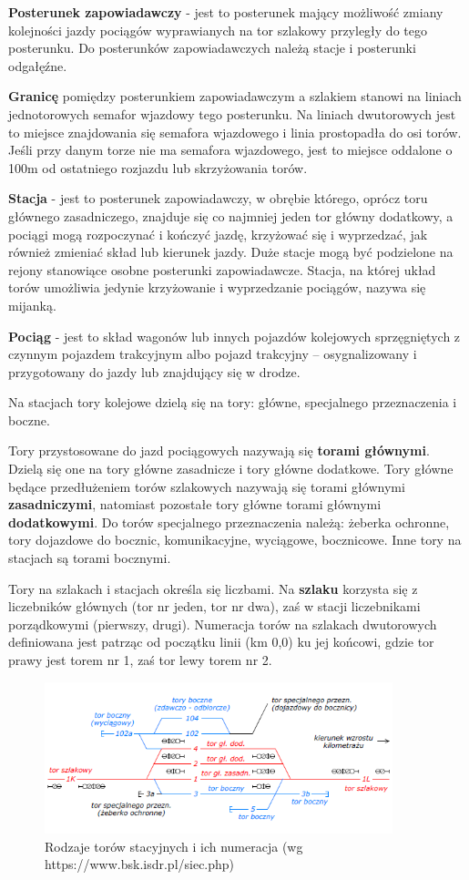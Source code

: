 \textbf{Posterunek zapowiadawczy} - jest to posterunek mający możliwość zmiany kolejności jazdy pociągów wyprawianych na tor szlakowy przyległy do tego posterunku. Do posterunków zapowiadawczych należą stacje i posterunki odgałęźne.

\textbf{Granicę} pomiędzy posterunkiem zapowiadawczym a szlakiem stanowi na liniach jednotorowych semafor wjazdowy tego posterunku. Na liniach dwutorowych jest to miejsce znajdowania się semafora wjazdowego i linia prostopadła do osi torów. Jeśli przy danym torze nie ma semafora wjazdowego, jest to miejsce oddalone o 100m od ostatniego rozjazdu lub skrzyżowania torów.

\textbf{Stacja} - jest to posterunek zapowiadawczy, w obrębie którego, oprócz toru głównego zasadniczego, znajduje się co najmniej jeden tor główny dodatkowy, a pociągi mogą rozpoczynać i kończyć jazdę, krzyżować się i wyprzedzać, jak również zmieniać skład lub kierunek jazdy. Duże stacje mogą być podzielone na rejony stanowiące osobne posterunki zapowiadawcze. Stacja, na której układ torów umożliwia jedynie krzyżowanie i wyprzedzanie pociągów, nazywa się mijanką.

\textbf{Pociąg} - jest to skład wagonów lub innych pojazdów kolejowych sprzęgniętych z czynnym pojazdem trakcyjnym albo pojazd trakcyjny – osygnalizowany i przygotowany do jazdy lub znajdujący się w drodze.

Na stacjach tory kolejowe dzielą się na tory: główne, specjalnego przeznaczenia i boczne.

Tory przystosowane do jazd pociągowych nazywają się \textbf{torami głównymi}. Dzielą się one na tory główne zasadnicze i tory główne dodatkowe. Tory główne będące przedłużeniem torów szlakowych nazywają się torami głównymi \textbf{zasadniczymi}, natomiast pozostałe tory główne torami głównymi \textbf{dodatkowymi}. Do torów specjalnego przeznaczenia należą: żeberka ochronne, tory dojazdowe do bocznic, komunikacyjne, wyciągowe, bocznicowe. Inne tory na stacjach są torami bocznymi.

Tory na szlakach i stacjach określa się liczbami. Na \textbf{szlaku} korzysta się z liczebników głównych (tor nr jeden, tor nr dwa), zaś w stacji liczebnikami porządkowymi (pierwszy, drugi). Numeracja torów na szlakach dwutorowych definiowana jest patrząc od początku linii (km 0,0) ku jej końcowi, gdzie tor prawy jest torem nr 1, zaś tor lewy torem
nr 2.
	\begin{figure}
	\includegraphics[width=0.9\textwidth]{skryptkierownik-img/tory-numery.png}
	\caption{Rodzaje torów stacyjnych i ich numeracja (wg https://www.bsk.isdr.pl/siec.php)}
	\label{fig:numeracja-torow}
\end{figure}

